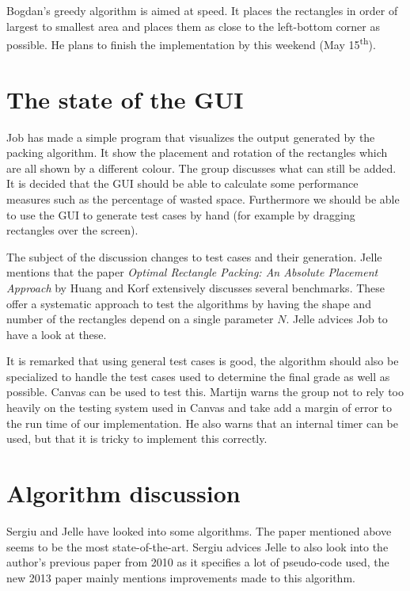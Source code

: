 \documentclass[a4paper,twoside,11pt]{article}
\newcommand{\ts}{\textsuperscript}
\begin{document}
	Bogdan's greedy algorithm is aimed at speed. It places the rectangles in order of largest to smallest area and places them as close to the left-bottom corner as possible. He plans to finish the implementation by this weekend (May 15\ts{th}).
	
	
	\section{The state of the GUI}
	
	Job has made a simple program that visualizes the output generated by the packing algorithm. It show the placement and rotation of the rectangles which are all shown by a different colour. The group discusses what can still be added. It is decided that the GUI should be able to calculate some performance measures such as the percentage of wasted space. Furthermore we should be able to use the GUI to generate test cases by hand (for example by dragging rectangles over the screen). 
	
	The subject of the discussion changes to test cases and their generation. Jelle mentions that the paper \textit{Optimal Rectangle Packing: An Absolute Placement Approach} by Huang and Korf extensively discusses several benchmarks. These offer a systematic approach to test the algorithms by having the shape and number of the rectangles depend on a single parameter $N$. Jelle advices Job to have a look at these.
	
	It is remarked that using general test cases is good, the algorithm should also be specialized to handle the test cases used to determine the final grade as well as possible. Canvas can be used to test this. Martijn warns the group not to rely too heavily on the testing system used in Canvas and take add a margin of error to the run time of our implementation. He also warns that an internal timer can be used, but that it is tricky to implement this correctly. 
	
	
	\section{Algorithm discussion}
	
	Sergiu and Jelle have looked into some algorithms. The paper mentioned above seems to be the most state-of-the-art. Sergiu advices Jelle to also look into the author's previous paper from 2010 as it specifies a lot of pseudo-code used, the new 2013 paper mainly mentions improvements made to this algorithm.
	
\end{document}
